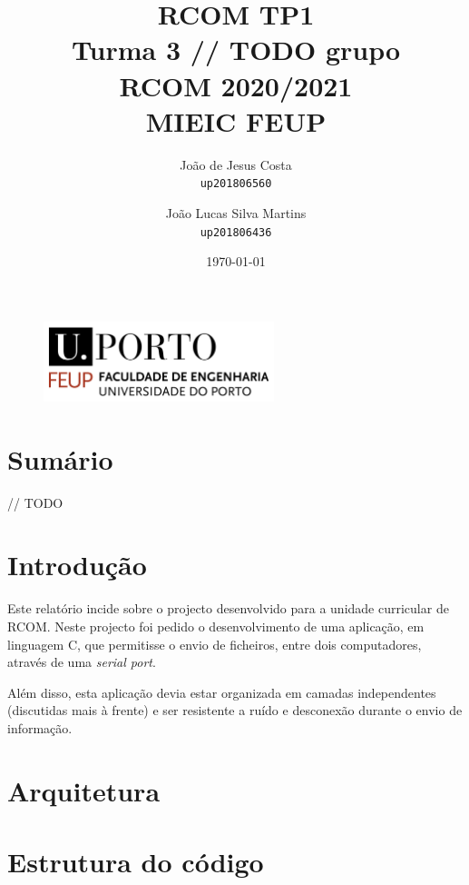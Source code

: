 \documentclass{report}
\begin{document}
\title{\huge{\textbf{RCOM TP1}} \\ Turma 3 // TODO grupo \\ RCOM 2020/2021 \\ MIEIC FEUP}
\author{João de Jesus Costa \\ \texttt{up201806560} \and
	João Lucas Silva Martins \\ \texttt{up201806436}}
\date{\today{}}

\begin{figure}[b]
	\centering
	\includegraphics[width=0.6\textwidth]{feup_logo.png}
\end{figure}
\maketitle{}

\tableofcontents{}
\newpage

\chapter{Sumário}
// TODO

\chapter{Introdução}
Este relatório incide sobre o projecto desenvolvido para a unidade curricular
de RCOM. Neste projecto foi pedido o desenvolvimento de uma aplicação, em
linguagem C, que permitisse o envio de ficheiros, entre dois computadores,
através de uma \textit{serial port}.

Além disso, esta aplicação devia estar organizada em camadas independentes
(discutidas mais à frente) e ser resistente a ruído e desconexão durante
o envio de informação.

\chapter{Arquitetura}

{\let\clearpage\relax \chapter{Estrutura do código}}
\end{document}
